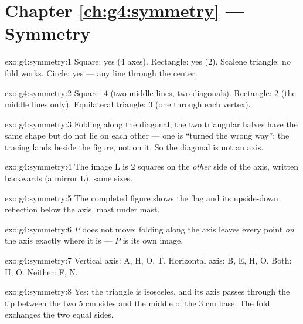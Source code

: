 \section*{Chapter \ref{ch:g4:symmetry} --- Symmetry}

\begin{solution}{exo:g4:symmetry:1}
Square: yes ($4$ axes). Rectangle: yes ($2$). Scalene triangle: no
fold works. Circle: yes --- any line through the center.
\end{solution}

\begin{solution}{exo:g4:symmetry:2}
Square: $4$ (two middle lines, two diagonals). Rectangle: $2$ (the
middle lines only). Equilateral triangle: $3$ (one through each
vertex).
\end{solution}

\begin{solution}{exo:g4:symmetry:3}
Folding along the diagonal, the two triangular halves have the same
shape but do not lie on each other --- one is ``turned the wrong
way'': the tracing lands beside the figure, not on it. So the
diagonal is not an axis.
\end{solution}

\begin{solution}{exo:g4:symmetry:4}
The image L is $2$ squares on the \emph{other} side of the axis,
written backwards (a mirror L), same sizes.
\end{solution}

\begin{solution}{exo:g4:symmetry:5}
The completed figure shows the flag and its upside-down reflection
below the axis, mast under mast.
\end{solution}

\begin{solution}{exo:g4:symmetry:6}
$P$ does not move: folding along the axis leaves every point
\emph{on} the axis exactly where it is --- $P$ is its own image.
\end{solution}

\begin{solution}{exo:g4:symmetry:7}
Vertical axis: A, H, O, T. Horizontal axis: B, E, H, O. Both: H, O.
Neither: F, N.
\end{solution}

\begin{solution}{exo:g4:symmetry:8}
Yes: the triangle is isosceles, and its axis passes through the tip
between the two $5$ cm sides and the middle of the $3$ cm base. The
fold exchanges the two equal sides.
\end{solution}


